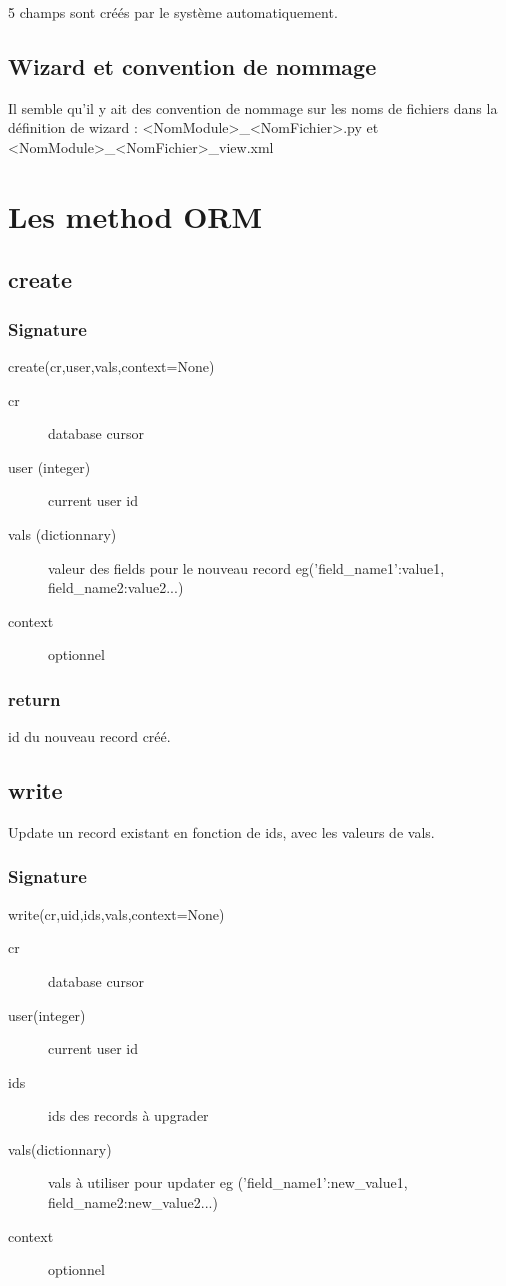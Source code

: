\documentclass[12pt,a4paper]{article}
\begin{document}
5 champs sont créés par le système automatiquement.

\subsection{Wizard et convention de nommage}

Il semble qu’il y ait des convention de nommage sur les noms de fichiers dans la définition de wizard : <NomModule>\_<NomFichier>.py et <NomModule>\_<NomFichier>\_view.xml

\section{Les method ORM}
\label{sec:orm_methods}

\subsection{create}
\label{sec:create}

\subsubsection{Signature}
\label{sec:sig_create}

create(cr,user,vals,context=None)
\begin{description}
\item[cr] database cursor
\item[user (integer)] current user id
\item[vals (dictionnary)] valeur des fields pour le nouveau record eg('field\_name1':value1, field\_name2:value2...)
\item[context] optionnel
\end{description}

\subsubsection{return}
\label{sec:return_create}

id du nouveau record créé.

\subsection{write}
\label{sec:write_method}
Update un record existant en fonction de ids, avec les valeurs de vals.

\subsubsection{Signature}
\label{sec:write_sig}
write(cr,uid,ids,vals,context=None)
\begin{description}
\item[cr] database cursor
\item[user(integer)] current user id
\item[ids] ids des records à upgrader
\item[vals(dictionnary)] vals à utiliser pour updater eg ('field\_name1':new\_value1, field\_name2:new\_value2...)
\item[context] optionnel
\end{description}
\end{document}
